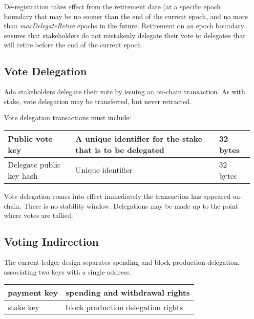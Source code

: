 De-registration takes effect from the retirement date (at a specific epoch boundary that may be no sooner than the end of the current epoch, and no more than \emph{maxDelegateRetire} epochs in the future.  Retirement on an epoch boundary ensures that stakeholders do not mistakenly delegate their vote to delegates that will retire before the end of the current epoch.

\subsection{Vote Delegation}

Ada stakeholders delegate their vote by issuing an on-chain transaction.  As with stake, vote delegation may be transferred, but never retracted.

Vote delegation transactions must include:

\begin{tabular}{||l|p{3in}|l||}
  \hline\hline
  Public vote key & A unique identifier for the stake that is to be delegated  & 32 bytes
  \\\hline
  Delegate public key hash & Unique identifier & 32 bytes
  \\\hline
  \hline
\end{tabular}

Vote delegation comes into effect immediately the transaction has appeared on-chain.  There is no stability window.  Delegations may be made up to the point where votes are tallied.

\subsection{Voting Indirection}

The current ledger design separates spending and block production delegation, associating two keys with a single address.

\begin{center}
  \begin{tabular}{||l|l||}
\hline\hline
  payment key & spending and withdrawal rights \\\hline
  stake key & block production delegation rights \\\hline
  \hline\hline
  \end{tabular}
\end{center}

